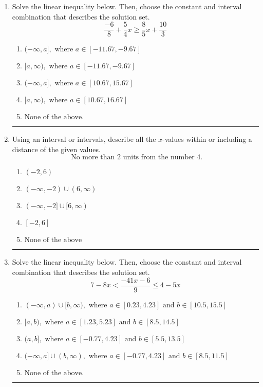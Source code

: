 \documentclass[14pt]{extbook}
\newcommand{\litem}[1]{\item#1\hspace*{-1cm}\rule{\textwidth}{0.4pt}}
\begin{document}
\begin{enumerate}
{\begin{enumerate}[label=\Alph*.]
\end{enumerate} }
\litem{
Solve the linear inequality below. Then, choose the constant and interval combination that describes the solution set.\[ \frac{-6}{8} + \frac{5}{4} x \geq \frac{8}{5} x + \frac{10}{3} \]\begin{enumerate}[label=\Alph*.]
\item \( (-\infty, a], \text{ where } a \in [-11.67, -9.67] \)
\item \( [a, \infty), \text{ where } a \in [-11.67, -9.67] \)
\item \( (-\infty, a], \text{ where } a \in [10.67, 15.67] \)
\item \( [a, \infty), \text{ where } a \in [10.67, 16.67] \)
\item \( \text{None of the above}. \)

\end{enumerate} }
\litem{
Using an interval or intervals, describe all the $x$-values within or including a distance of the given values.\[ \text{ No more than } 2 \text{ units from the number } 4. \]\begin{enumerate}[label=\Alph*.]
\item \( (-2, 6) \)
\item \( (-\infty, -2) \cup (6, \infty) \)
\item \( (-\infty, -2] \cup [6, \infty) \)
\item \( [-2, 6] \)
\item \( \text{None of the above} \)

\end{enumerate} }
\litem{
Solve the linear inequality below. Then, choose the constant and interval combination that describes the solution set.\[ 7 - 8 x < \frac{-41 x - 6}{9} \leq 4 - 5 x \]\begin{enumerate}[label=\Alph*.]
\item \( (-\infty, a) \cup [b, \infty), \text{ where } a \in [0.23, 4.23] \text{ and } b \in [10.5, 15.5] \)
\item \( [a, b), \text{ where } a \in [1.23, 5.23] \text{ and } b \in [8.5, 14.5] \)
\item \( (a, b], \text{ where } a \in [-0.77, 4.23] \text{ and } b \in [5.5, 13.5] \)
\item \( (-\infty, a] \cup (b, \infty), \text{ where } a \in [-0.77, 4.23] \text{ and } b \in [8.5, 11.5] \)
\item \( \text{None of the above.} \)


\end{enumerate}}
\end{enumerate}
\end{document}
